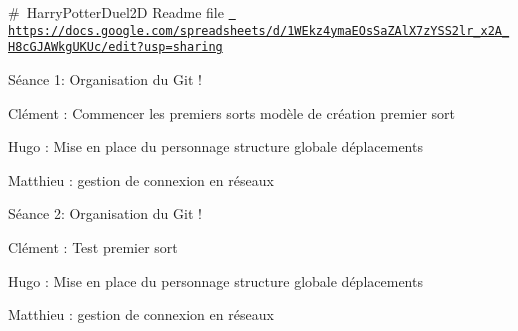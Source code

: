 \#~Harry\+Potter\+Duel2D Readme file \href{https://docs.google.com/spreadsheets/d/1WEkz4ymaEOsSaZAlX7zYSS2lr_x2A_H8cGJAWkgUKUc/edit?usp=sharing}{\texttt{ https\+://docs.\+google.\+com/spreadsheets/d/1\+W\+Ekz4yma\+E\+Os\+Sa\+Z\+Al\+X7z\+Y\+S\+S2lr\+\_\+x2\+A\+\_\+\+H8c\+G\+J\+A\+Wkg\+U\+K\+Uc/edit?usp=sharing}}

Séance 1\+: Organisation du Git !

Clément \+: Commencer les premiers sorts modèle de création premier sort

Hugo \+: Mise en place du personnage structure globale déplacements

Matthieu \+: gestion de connexion en réseaux

Séance 2\+: Organisation du Git !

Clément \+: Test premier sort

Hugo \+: Mise en place du personnage structure globale déplacements

Matthieu \+: gestion de connexion en réseaux 